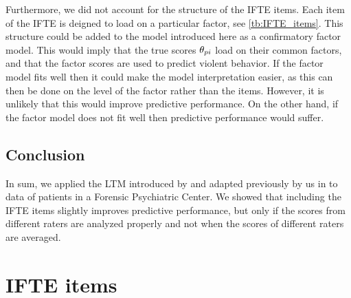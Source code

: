 \documentclass[a4paper,11pt]{article}
\begin{document}
Furthermore, we did not account for the structure of the IFTE items.
Each item of the IFTE is deigned to load on a particular factor, see \autoref{tb:IFTE_items}.
This structure could be added to the model introduced here as a confirmatory factor model.
This would imply that the true scores $\theta_{pi}$ load on their common factors, and that the factor scores are used to predict violent behavior.
If the factor model fits well then it could make the model interpretation easier, as this can then be done on the level of the factor rather than the items.
However, it is unlikely that this would improve predictive performance.
On the other hand, if the factor model does not fit well then predictive performance would suffer.

\subsection{Conclusion}
In sum, we applied the LTM introduced by \textcite{Anders2015cultural} and adapted previously by us in \textcite{vandenBergh2020cultural} to data of patients in a Forensic Psychiatric Center.
We showed that including the IFTE items slightly improves predictive performance, but only if the scores from different raters are analyzed properly and not when the scores of different raters are averaged.



\printbibliography
\newpage

\appendix

\section{IFTE items}
\end{document}
